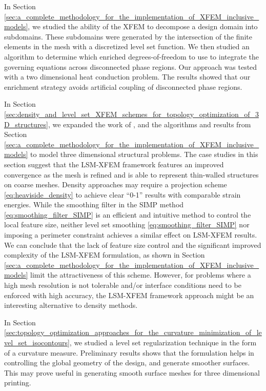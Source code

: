 \documentclass[12pt,letterpaper]{report}
\begin{document}
In Section \ref{sec:a_complete_methodology_for_the_implementation_of_XFEM_inclusive_models}, we studied the ability of the XFEM to decompose a design domain into subdomains. These subdomains were generated by the intersection of the finite elements in the mesh with a discretized level set function. We then studied an algorithm to determine which enriched degrees-of-freedom to use to integrate the governing equations across disconnected phase regions. Our approach was tested with a two dimensional heat conduction problem. The results showed that our enrichment strategy avoids artificial coupling of disconnected phase regions.

In Section \ref{sec:density_and_level_set_XFEM_schemes_for_topology_optimization_of_3D_structures}, we expanded the work of \citep{MM:13}, and the algorithms and results from Section \ref{sec:a_complete_methodology_for_the_implementation_of_XFEM_inclusive_models} to model three dimensional structural problems. The case studies in this section suggest that the LSM-XFEM framework features an improved convergence as the mesh is refined and is able to represent thin-walled structures on coarse meshes. Density approaches may require a projection scheme \ref{eq:heaviside_density} to achieve clear ``0-1'' results with comparable strain energies. While the smoothing filter in the SIMP method \ref{eq:smoothing_filter_SIMP} is an efficient and intuitive method to control the local feature size, neither level set smoothing \ref{eq:smoothing_filter_SIMP} nor imposing a perimeter constraint achieves a similar effect on LSM-XFEM results. We can conclude that the lack of feature size control and the significant improved complexity of the LSM-XFEM formulation, as shown in Section \ref{sec:a_complete_methodology_for_the_implementation_of_XFEM_inclusive_models} limit the attractiveness of this scheme. However, for problems where a high mesh resolution is not tolerable and/or interface conditions need to be enforced with high accuracy, the LSM-XFEM framework approach might be an interesting alternative to density methods. 

In Section \ref{sec:topology_optimization_approaches_for_the_curvature_minimization_of_level_set_isocontours}, we studied a level set regularization technique in the form of a curvature measure. Preliminary results shows that the formulation helps in controlling the global geometry of the design, and generate smoother surfaces. This may prove useful in generating smooth surface meshes for three dimensional printing.
\end{document}
